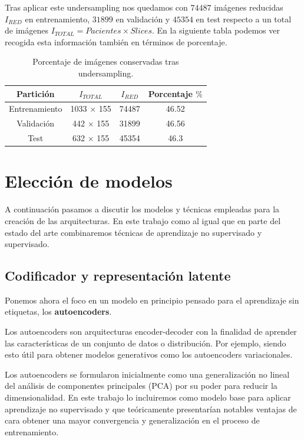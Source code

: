 Tras aplicar este undersampling nos quedamos con $74487$ imágenes reducidas $I_{RED}$ en entrenamiento, $31899$ en validación y $45354$ en test respecto a un total de imágenes $I_{TOTAL} = Pacientes \times Slices$. En la siguiente tabla podemos ver recogida esta información también en términos de porcentaje.

\begin{table}[H]
	\centering
	\begin{tabular}{cccc}
		\hline
		\toprule
		\textbf{Partición} & \textbf{$I_{TOTAL}$} & \textbf{$I_{RED}$} & \textbf{Porcentaje $\%$} \\ 
		\midrule
		Entrenamiento & 1033 $\times$ 155 & 74487 &  46.52 \\ 
		Validación & 442 $\times$ 155 & 31899 & 46.56 \\ 
		Test & 632 $\times$ 155 & 45354 &  46.3\\ 
		\bottomrule
	\end{tabular}
	\caption{Porcentaje de imágenes conservadas tras undersampling.}
\end{table}


\section{Elección de modelos}

A continuación pasamos a discutir los modelos y técnicas empleadas para la creación de las arquitecturas. En este trabajo como al igual que en parte del estado del arte combinaremos técnicas de aprendizaje no supervisado y supervisado.

\subsection{Codificador y representación latente}

Ponemos ahora el foco en un modelo en principio pensado para el aprendizaje sin etiquetas, los \textbf{autoencoders}.

Los autoencoders son arquitecturas encoder-decoder con la finalidad de aprender las características de un conjunto de datos o distribución. Por ejemplo, siendo esto útil para obtener modelos generativos como los autoencoders variacionales. 

Los autoencoders se formularon inicialmente como una generalización no lineal del análisis de componentes principales (PCA) por su poder para reducir la dimensionalidad. En este trabajo lo incluiremos como modelo base para aplicar aprendizaje no supervisado y que teóricamente presentarían notables ventajas de cara obtener una mayor convergencia y generalización en el proceso de entrenamiento. 

